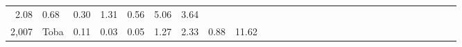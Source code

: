 \documentclass[]{article}
\begin{document}
\begin{longtable}[]{@{}rlrrrrrrrrrrrrrrrrrrrrrrrrrrr@{}}
\begin{minipage}[t]{0.01\columnwidth}
2.08\strut
\end{minipage} & \begin{minipage}[t]{0.01\columnwidth}\raggedleft\strut
0.68\strut
\end{minipage} & \begin{minipage}[t]{0.02\columnwidth}\raggedleft\strut
0.30\strut
\end{minipage} & \begin{minipage}[t]{0.01\columnwidth}\raggedleft\strut
1.31\strut
\end{minipage} & \begin{minipage}[t]{0.01\columnwidth}\raggedleft\strut
0.56\strut
\end{minipage} & \begin{minipage}[t]{0.01\columnwidth}\raggedleft\strut
5.06\strut
\end{minipage} & \begin{minipage}[t]{0.01\columnwidth}\raggedleft\strut
3.64\strut
\end{minipage}\tabularnewline
\begin{minipage}[t]{0.01\columnwidth}\raggedleft\strut
2,007\strut
\end{minipage} & \begin{minipage}[t]{0.02\columnwidth}\raggedright\strut
Toba\strut
\end{minipage} & \begin{minipage}[t]{0.01\columnwidth}\raggedleft\strut
0.11\strut
\end{minipage} & \begin{minipage}[t]{0.02\columnwidth}\raggedleft\strut
0.03\strut
\end{minipage} & \begin{minipage}[t]{0.02\columnwidth}\raggedleft\strut
0.05\strut
\end{minipage} & \begin{minipage}[t]{0.02\columnwidth}\raggedleft\strut
1.27\strut
\end{minipage} & \begin{minipage}[t]{0.01\columnwidth}\raggedleft\strut
2.33\strut
\end{minipage} & \begin{minipage}[t]{0.01\columnwidth}\raggedleft\strut
0.88\strut
\end{minipage} & \begin{minipage}[t]{0.01\columnwidth}\raggedleft\strut
11.62\strut
\end{minipage} & \begin{minipage}[t]{0.01\columnwidth}\raggedleft\strut

\end{minipage}
\end{longtable}
\end{document}

